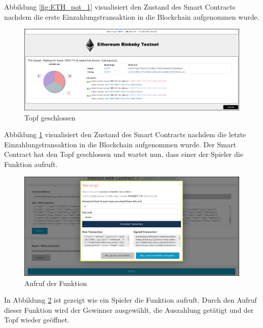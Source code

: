 Abbildung \ref{fig:ETH_pot_1} visualisiert den Zustand des Smart Contracts nachdem die erste Einzahlungstransaktion in die Blockchain aufgenommen wurde.

\begin{figure}[H]
\centering
\includegraphics[width=1\linewidth]{Figures/eth_gui/ETH_pot_closed}
\decoRule
\caption{Topf geschlossen}
\label{fig:ETH_pot_closed}
\end{figure}

Abbildung \ref{fig:ETH_pot_closed} visualisiert den Zustand des Smart Contracts nachdem die letzte Einzahlungstransaktion in die Blockchain aufgenommen wurde. Der Smart Contract hat den Topf geschlossen und wartet nun, dass einer der Spieler die  Funktion aufruft.

\begin{figure}[H]
\centering
\includegraphics[width=1\linewidth]{Figures/eth_gui/ETH_wallet_payout}
\decoRule
\caption{Aufruf der  Funktion}
\label{fig:ETH_wallet_payout}
\end{figure}

In Abbildung \ref{fig:ETH_wallet_payout} ist gezeigt wie ein Spieler die   Funktion aufruft. Durch den Aufruf dieser Funktion wird der Gewinner ausgewählt, die Auszahlung getätigt und der Topf wieder geöffnet.

